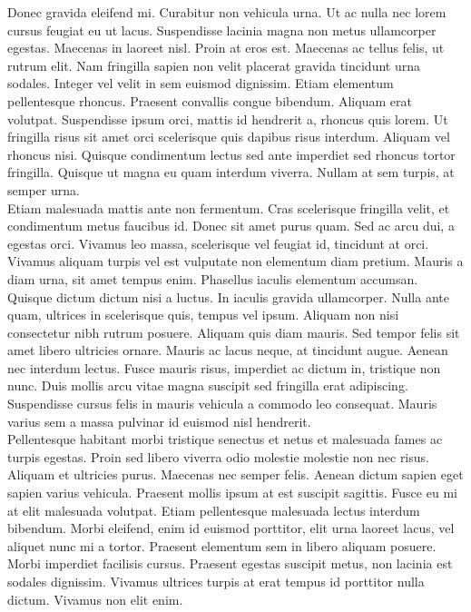 Donec gravida eleifend mi. Curabitur non vehicula urna. Ut ac nulla nec lorem cursus feugiat eu ut lacus. Suspendisse lacinia magna non metus ullamcorper egestas. Maecenas in laoreet nisl. Proin at eros est. Maecenas ac tellus felis, ut rutrum elit. Nam fringilla sapien non velit placerat gravida tincidunt urna sodales. Integer vel velit in sem euismod dignissim. Etiam elementum pellentesque rhoncus. Praesent convallis congue bibendum. Aliquam erat volutpat. Suspendisse ipsum orci, mattis id hendrerit a, rhoncus quis lorem. Ut fringilla risus sit amet orci scelerisque quis dapibus risus interdum. Aliquam vel rhoncus nisi. Quisque condimentum lectus sed ante imperdiet sed rhoncus tortor fringilla. Quisque ut magna eu quam interdum viverra. Nullam at sem turpis, at semper urna.\\

Etiam malesuada mattis ante non fermentum. Cras scelerisque fringilla velit, et condimentum metus faucibus id. Donec sit amet purus quam. Sed ac arcu dui, a egestas orci. Vivamus leo massa, scelerisque vel feugiat id, tincidunt at orci. Vivamus aliquam turpis vel est vulputate non elementum diam pretium. Mauris a diam urna, sit amet tempus enim. Phasellus iaculis elementum accumsan. Quisque dictum dictum nisi a luctus. In iaculis gravida ullamcorper. Nulla ante quam, ultrices in scelerisque quis, tempus vel ipsum. Aliquam non nisi consectetur nibh rutrum posuere. Aliquam quis diam mauris. Sed tempor felis sit amet libero ultricies ornare. Mauris ac lacus neque, at tincidunt augue. Aenean nec interdum lectus. Fusce mauris risus, imperdiet ac dictum in, tristique non nunc. Duis mollis arcu vitae magna suscipit sed fringilla erat adipiscing. Suspendisse cursus felis in mauris vehicula a commodo leo consequat. Mauris varius sem a massa pulvinar id euismod nisl hendrerit.\\

Pellentesque habitant morbi tristique senectus et netus et malesuada fames ac turpis egestas. Proin sed libero viverra odio molestie molestie non nec risus. Aliquam et ultricies purus. Maecenas nec semper felis. Aenean dictum sapien eget sapien varius vehicula. Praesent mollis ipsum at est suscipit sagittis. Fusce eu mi at elit malesuada volutpat. Etiam pellentesque malesuada lectus interdum bibendum. Morbi eleifend, enim id euismod porttitor, elit urna laoreet lacus, vel aliquet nunc mi a tortor. Praesent elementum sem in libero aliquam posuere. Morbi imperdiet facilisis cursus. Praesent egestas suscipit metus, non lacinia est sodales dignissim. Vivamus ultrices turpis at erat tempus id porttitor nulla dictum. Vivamus non elit enim.

